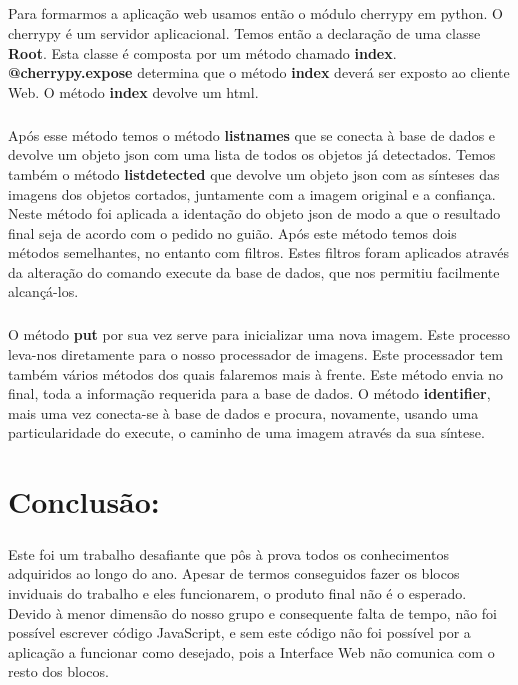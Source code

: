 \documentclass{report}
\begin{document}
\paragraph{}
Para formarmos a aplicação web usamos então o módulo cherrypy em python. O cherrypy é um servidor aplicacional. Temos então a declaração de uma classe \textbf{Root}. Esta classe é composta por um método chamado \textbf{index}. 
\textbf{@cherrypy.expose} determina que o método \textbf{index} deverá ser exposto ao cliente Web. O método \textbf{index} devolve um html.
\paragraph{}
Após esse método temos o método \textbf{listnames} que se conecta à base de dados e devolve um objeto json com uma lista de todos os objetos já detectados.
Temos também o método \textbf{listdetected} que devolve um objeto json com as sínteses das imagens dos objetos cortados, juntamente com a imagem original e a confiança. Neste método foi aplicada a identação do objeto json de modo a que o resultado final seja de acordo com o pedido no guião.
Após este método temos dois métodos semelhantes, no entanto com filtros. Estes filtros foram aplicados através da alteração do comando execute da base de dados, que nos permitiu facilmente alcançá-los.
\paragraph{}
O método \textbf{put} por sua vez serve para inicializar uma nova imagem. Este processo leva-nos diretamente para o nosso processador de imagens. Este processador tem também vários métodos dos quais falaremos mais à frente. Este método envia no final, toda a informação requerida para a base de dados.
O método \textbf{identifier}, mais uma vez conecta-se à base de dados e procura, novamente, usando uma particularidade do execute, o caminho de uma imagem através da sua síntese.

\chapter{Conclusão:}
\label{chap:conclusao}
\paragraph{}	

Este foi um trabalho desafiante que pôs à prova todos os conhecimentos adquiridos ao longo do ano. Apesar de termos conseguidos fazer os blocos inviduais do trabalho e eles funcionarem, o produto final não é o esperado. Devido à menor dimensão do nosso grupo e consequente falta de tempo, não foi possível escrever código JavaScript, e sem este código não foi possível por a aplicação a funcionar como desejado, pois a Interface Web não comunica com o resto dos blocos.
\end{document}
